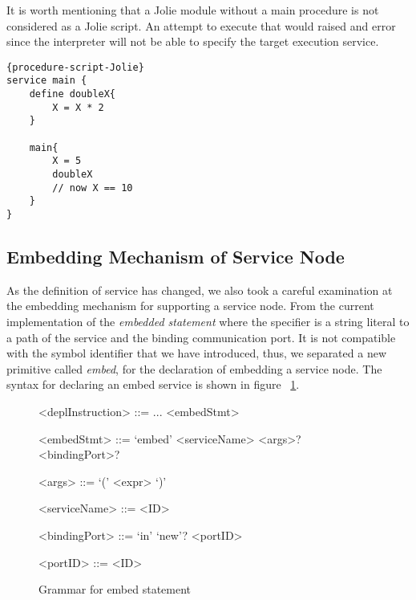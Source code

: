 It is worth mentioning that a Jolie module without a main procedure is not considered as a Jolie script. An attempt to execute that would raised and error since the interpreter will not be able to specify the target execution service.

\begin{listing}[h]
    \lstset{language=Jolie,
        style=codeStyle
    }
    \begin{lstlisting}[frame=tlrb]{procedure-script-Jolie}
service main {
    define doubleX{
        X = X * 2
    }

    main{
        X = 5
        doubleX
        // now X == 10
    }
}
\end{lstlisting}
\caption{Jolie script version of ~\ref{list:jolie-procedure-script}}
\label{list:jolie-procedure-script}
\end{listing}

\subsection{Embedding Mechanism of Service Node}

As the definition of service has changed, we also took a careful examination at the embedding mechanism for supporting a service node.
From the current implementation of the \textit{embedded statement} where the specifier is a string literal to a path of the service and the binding communication port. It is not compatible with the symbol identifier that we have introduced, thus, we separated a new primitive called \textit{embed}, for the declaration of embedding a service node.
The syntax for declaring an embed service is shown in figure ~\ref{fig:jolie-servicenode-embed-grammar}.


\begin{figure}[h]
    \begin{framed}
        \begin{grammar}
            <deplInstruction> ::= ...
            \alt <embedStmt>

            <embedStmt> ::= `embed' <serviceName> <args>? <bindingPort>?

            <args> ::= `(' <expr> `)'

            <serviceName> ::= <ID>

            <bindingPort> ::= `in' `new'? <portID>

            <portID> ::= <ID>

        \end{grammar}
    \end{framed}
    \caption{Grammar for embed statement}
    \label{fig:jolie-servicenode-embed-grammar}
\end{figure}

